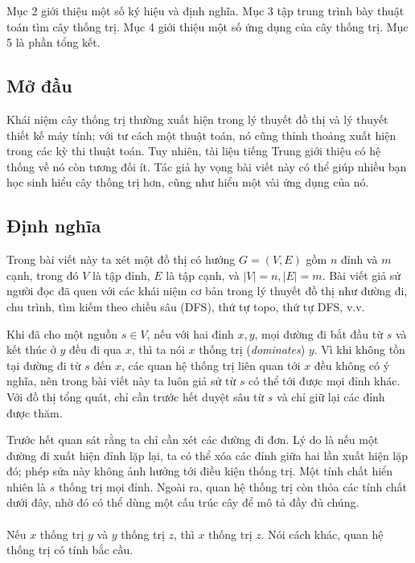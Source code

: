 \documentclass[11pt]{article}
\begin{document}
Mục 2 giới thiệu một số ký hiệu và định nghĩa. Mục 3 tập trung trình bày thuật
toán tìm cây thống trị. Mục 4 giới thiệu một số ứng dụng của cây thống trị. Mục
5 là phần tổng kết.

\subsection{Mở đầu}

Khái niệm cây thống trị thường xuất hiện trong lý thuyết đồ thị và lý thuyết
thiết kế máy tính; với tư cách một thuật toán, nó cũng thỉnh thoảng xuất hiện
trong các kỳ thi thuật toán. Tuy nhiên, tài liệu tiếng Trung giới thiệu có hệ
thống về nó còn tương đối ít. Tác giả hy vọng bài viết này có thể giúp nhiều
bạn học sinh hiểu cây thống trị hơn, cũng như hiểu một vài ứng dụng của nó.

\subsection{Định nghĩa}

Trong bài viết này ta xét một đồ thị có hướng \(G=(V,E)\) gồm \(n\) đỉnh và
\(m\) cạnh, trong đó \(V\) là tập đỉnh, \(E\) là tập cạnh, và
\(|V|=n, |E|=m\). Bài viết giả sử người đọc đã quen với các khái niệm cơ bản
trong lý thuyết đồ thị như đường đi, chu trình, tìm kiếm theo chiều sâu (DFS),
thứ tự topo, thứ tự DFS, v.v.

Khi đã cho một nguồn \(s\in V\), nếu với hai đỉnh \(x,y\), mọi đường đi bắt
đầu từ \(s\) và kết thúc ở \(y\) đều đi qua \(x\), thì ta nói \(x\) thống trị
(\emph{dominates}) \(y\). Vì khi không tồn tại đường đi từ \(s\) đến \(x\), các
quan hệ thống trị liên quan tới \(x\) đều không có ý nghĩa, nên trong bài viết
này ta luôn giả sử từ \(s\) có thể tới được mọi đỉnh khác. Với đồ thị tổng quát,
chỉ cần trước hết duyệt sâu từ \(s\) và chỉ giữ lại các đỉnh được thăm.

Trước hết quan sát rằng ta chỉ cần xét các đường đi đơn. Lý do là nếu một
đường đi xuất hiện đỉnh lặp lại, ta có thể xóa các đỉnh giữa hai lần xuất hiện
lặp đó; phép sửa này không ảnh hưởng tới điều kiện thống trị. Một tính chất
hiển nhiên là \(s\) thống trị mọi đỉnh. Ngoài ra, quan hệ thống trị còn thỏa
các tính chất dưới đây, nhờ đó có thể dùng một cấu trúc cây để mô tả đầy đủ
chúng.

\paragraph{}
Nếu \(x\) thống trị \(y\) và \(y\) thống trị \(z\), thì \(x\) thống trị \(z\).
Nói cách khác, quan hệ thống trị có tính bắc cầu.
\end{document}
